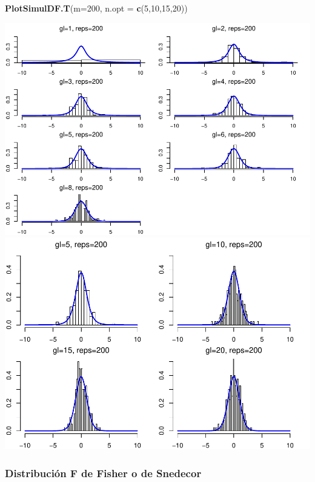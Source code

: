 \documentclass[]{article}
\newenvironment{Shaded}{\begin{snugshade}}{\end{snugshade}}
\newcommand{\DataTypeTok}[1]{\textcolor[rgb]{0.13,0.29,0.53}{#1}}
\newcommand{\DecValTok}[1]{\textcolor[rgb]{0.00,0.00,0.81}{#1}}
\newcommand{\KeywordTok}[1]{\textcolor[rgb]{0.13,0.29,0.53}{\textbf{#1}}}
\newcommand{\NormalTok}[1]{#1}
\begin{document}
\begin{Shaded}
\begin{Highlighting}[]
\KeywordTok{PlotSimulDF.T}\NormalTok{(}\DataTypeTok{m=}\DecValTok{200}\NormalTok{, }\DataTypeTok{n.opt =} \KeywordTok{c}\NormalTok{(}\DecValTok{5}\NormalTok{,}\DecValTok{10}\NormalTok{,}\DecValTok{15}\NormalTok{,}\DecValTok{20}\NormalTok{))}
\end{Highlighting}
\end{Shaded}

\includegraphics{NotaDeClaseLong_files/figure-latex/unnamed-chunk-15-4.pdf}
\includegraphics{NotaDeClaseLong_files/figure-latex/unnamed-chunk-15-5.pdf}

\hypertarget{distribucion-f-de-fisher-o-de-snedecor}{%
\subsubsection{Distribución F de Fisher o de
Snedecor}\label{distribucion-f-de-fisher-o-de-snedecor}}
\end{document}
